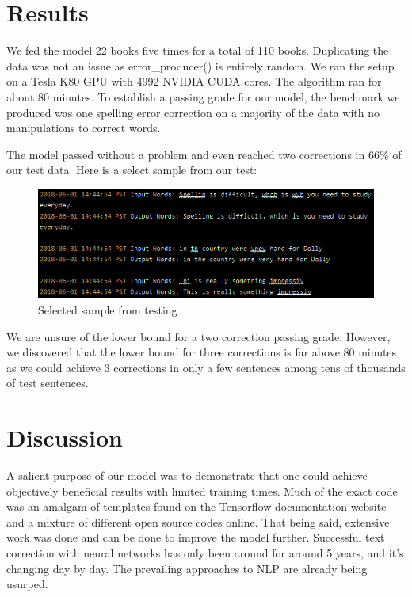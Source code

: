\documentclass[11pt,a4paper]{scrartcl}
\theoremstyle{definition}
\begin{document}
\section{Results}
We fed the model 22 books five times for a total of 110 books. Duplicating the data was not an issue as error\_producer() is entirely random. We ran the setup on a Tesla K80 GPU with 4992 NVIDIA CUDA cores. The algorithm ran for about 80 minutes. To establish a passing grade for our model, the benchmark we produced was one spelling error correction on a majority of the data with no manipulations to correct words.\newline

The model passed without a problem and even reached two corrections in 66\% of our test data. Here is a select sample from our test:

\begin{figure}[!ht]
\centering
\includegraphics[scale=1]{results_1.png}
\caption{Selected sample from testing}
\label{figR1}
\end{figure}
\FloatBarrier

We are unsure of the lower bound for a two correction passing grade. However, we discovered that the lower bound for three corrections is far above 80 minutes as we could achieve 3 corrections in only a few sentences among tens of thousands of test sentences.

\section{Discussion}
A salient purpose of our model was to demonstrate that one could achieve objectively beneficial results with limited training times. Much of the exact code was an amalgam of templates found on the Tensorflow documentation website and a mixture of different open source codes online. That being said, extensive work was done and can be done to improve the model further. Successful text correction with neural networks has only been around for around 5 years, and it's changing day by day. The prevailing approaches to NLP are already being usurped.
\end{document}
